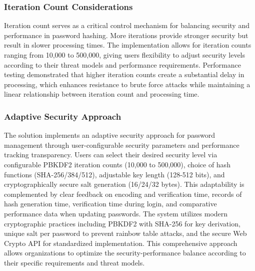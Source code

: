 \documentclass[11pt,a4paper]{article}
\begin{document}
\subsubsection{Iteration Count Considerations
}
Iteration count serves as a critical control mechanism for balancing security and performance in password hashing. More iterations provide stronger security but result in slower processing times. The implementation allows for iteration counts ranging from 10,000 to 500,000, giving users flexibility to adjust security levels according to their threat models and performance requirements. Performance testing demonstrated that higher iteration counts create a substantial delay in processing, which enhances resistance to brute force attacks while maintaining a linear relationship between iteration count and processing time.

\subsubsection{Adaptive Security Approach}
The solution implements an adaptive security approach for password management through user-configurable security parameters and performance tracking transparency. Users can select their desired security level via configurable PBKDF2 iteration counts (10,000 to 500,000), choice of hash functions (SHA-256/384/512), adjustable key length (128-512 bits), and cryptographically secure salt generation (16/24/32 bytes). This adaptability is complemented by clear feedback on encoding and verification time, records of hash generation time, verification time during login, and comparative performance data when updating passwords. The system utilizes modern cryptographic practices including PBKDF2 with SHA-256 for key derivation, unique salt per password to prevent rainbow table attacks, and the secure Web Crypto API for standardized implementation. This comprehensive approach allows organizations to optimize the security-performance balance according to their specific requirements and threat models.
\end{document}
